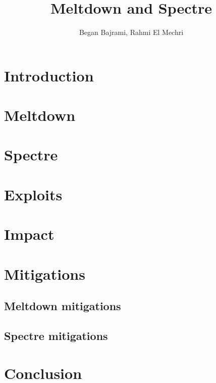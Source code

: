 \documentclass[12pt, a4paper, twocolumn]{article}
\title{Meltdown and Spectre}
\author{Began Bajrami, Rahmi El Mechri}
\begin{document}
\maketitle
\begin{abstract}
\end{abstract}
\section{Introduction}
\section{Meltdown}
\section{Spectre}
\section{Exploits}
\section{Impact}
\section{Mitigations}
\subsection{Meltdown mitigations}
\subsection{Spectre mitigations}
\section{Conclusion}
\end{document}
